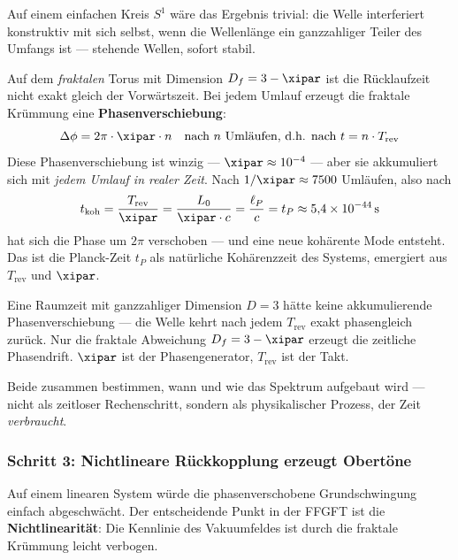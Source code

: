 Auf einem einfachen Kreis $S^1$ wäre das Ergebnis trivial: die Welle
interferiert konstruktiv mit sich selbst, wenn die Wellenlänge ein ganzzahliger
Teiler des Umfangs ist — stehende Wellen, sofort stabil.

Auf dem \emph{fraktalen} Torus mit Dimension $D_f = 3 - \xipar$ ist die
Rücklaufzeit nicht exakt gleich der Vorwärtszeit. Bei jedem Umlauf erzeugt
die fraktale Krümmung eine \textbf{Phasenverschiebung}:
\begin{equation}
    \Delta\phi = 2\pi \cdot \xipar \cdot n
    \quad \text{nach } n \text{ Umläufen, d.h. nach } t = n \cdot T_\text{rev}
\end{equation}
Diese Phasenverschiebung ist winzig — $\xipar \approx 10^{-4}$ — aber sie
akkumuliert sich mit \emph{jedem Umlauf in realer Zeit}. Nach
$1/\xipar \approx 7500$ Umläufen, also nach
\begin{equation}
    t_\text{koh} = \frac{T_\text{rev}}{\xipar} = \frac{L_0}{\xipar \cdot c}
    = \frac{\ell_P}{c} = t_P \approx 5{,}4 \times 10^{-44}\,\text{s}
\end{equation}
hat sich die Phase um $2\pi$ verschoben — und eine neue kohärente Mode entsteht.
Das ist die Planck-Zeit $t_P$ als natürliche Kohärenzzeit des Systems, emergiert
aus $T_\text{rev}$ und $\xipar$.

\begin{technical}
Eine Raumzeit mit ganzzahliger Dimension $D = 3$ hätte keine akkumulierende
Phasenverschiebung — die Welle kehrt nach jedem $T_\text{rev}$ exakt phasengleich
zurück. Nur die fraktale Abweichung $D_f = 3 - \xipar$ erzeugt die zeitliche
Phasendrift. $\xipar$ ist der Phasengenerator, $T_\text{rev}$ ist der Takt.

Beide zusammen bestimmen, wann und wie das Spektrum aufgebaut wird — nicht
als zeitloser Rechenschritt, sondern als physikalischer Prozess, der Zeit
\emph{verbraucht}.
\end{technical}

\subsubsection*{Schritt 3: Nichtlineare Rückkopplung erzeugt Obertöne}

Auf einem linearen System würde die phasenverschobene Grundschwingung
einfach abgeschwächt. Der entscheidende Punkt in der FFGFT ist die
\textbf{Nichtlinearität}: Die Kennlinie des Vakuumfeldes ist durch die
fraktale Krümmung leicht verbogen.

